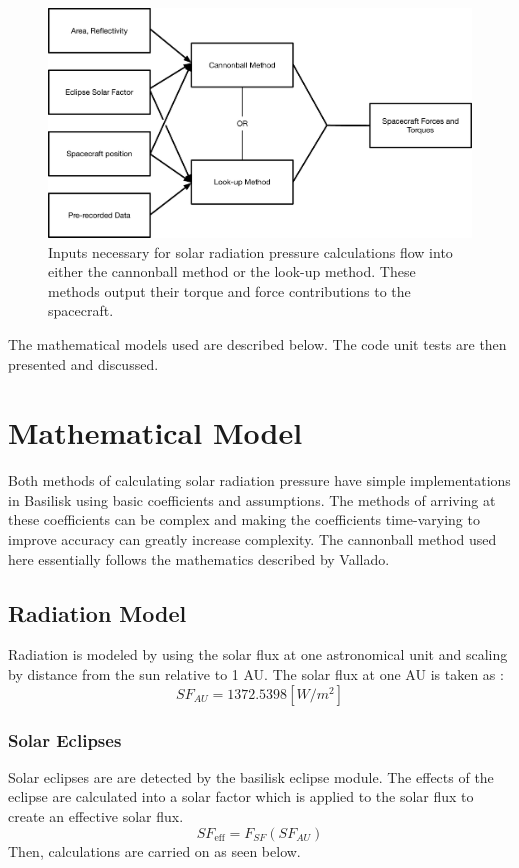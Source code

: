 \documentclass[]{BasiliskReportMemo}
\begin{document}
\begin{figure}[H]
\centering \includegraphics[height=0.5\textwidth, keepaspectratio]{Figures/codeFlow.pdf}
\caption{Inputs necessary for solar radiation pressure calculations flow into either the cannonball method or the look-up method. These methods output their torque and force contributions to the spacecraft.}
\label{img:codeFlow}
\end{figure}

The mathematical models used are described below. The code unit tests are then presented and discussed.



\section{Mathematical Model}
Both methods of calculating solar radiation pressure have simple implementations in Basilisk using basic coefficients and assumptions. The methods of arriving at these coefficients can be complex and making the coefficients time-varying to improve accuracy can greatly increase complexity. The cannonball method used here essentially follows the mathematics described by Vallado\cite{vallado2001}.
\subsection{Radiation Model}
Radiation is modeled by using the solar flux at one astronomical unit and scaling by distance from the sun relative to 1 AU. The solar flux at one AU is taken as :
\begin{equation}
SF_{AU} = 1372.5398    [W/m^2]
\end{equation}
\subsubsection{Solar Eclipses}
Solar eclipses are are detected by the basilisk eclipse module. The effects of the eclipse are calculated into a solar factor which is applied to the solar flux to create an effective solar flux. 
\begin{equation}
SF_{\mathrm{eff}} = F_{SF} (SF_{AU})
\end{equation}
Then, calculations are carried on as seen below.
\end{document}
